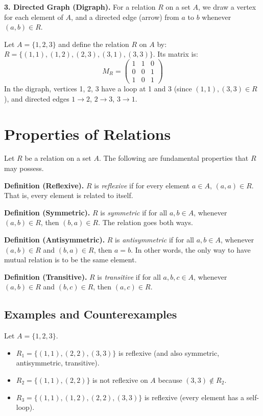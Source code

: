 \documentclass[11pt,a4paper]{article}
\begin{document}
\textbf{3. Directed Graph (Digraph).} For a relation $R$ on a set $A$, we draw a vertex for each element of $A$, and a directed edge (arrow) from $a$ to $b$ whenever $(a, b) \in R$.

\begin{example}
Let $A = \{1, 2, 3\}$ and define the relation $R$ on $A$ by: $R = \{(1,1), (1,2), (2,3), (3,1), (3,3)\}$. Its matrix is:
\begin{equation*}
    M_R = \begin{pmatrix}
        1 & 1 & 0 \\
        0 & 0 & 1 \\
        1 & 0 & 1
    \end{pmatrix}
\end{equation*}
In the digraph, vertices 1, 2, 3 have a loop at 1 and 3 (since $(1,1), (3,3) \in R$), and directed edges $1 \to 2$, $2 \to 3$, $3 \to 1$.
\end{example}

\section{Properties of Relations}

Let $R$ be a relation on a set $A$. The following are fundamental properties that $R$ may possess.

\textbf{Definition (Reflexive).} $R$ is \textit{reflexive} if for every element $a \in A$, $(a, a) \in R$. That is, every element is related to itself.

\textbf{Definition (Symmetric).} $R$ is \textit{symmetric} if for all $a, b \in A$, whenever $(a, b) \in R$, then $(b, a) \in R$. The relation goes both ways.

\textbf{Definition (Antisymmetric).} $R$ is \textit{antisymmetric} if for all $a, b \in A$, whenever $(a, b) \in R$ and $(b, a) \in R$, then $a = b$. In other words, the only way to have mutual relation is to be the same element.

\textbf{Definition (Transitive).} $R$ is \textit{transitive} if for all $a, b, c \in A$, whenever $(a, b) \in R$ and $(b, c) \in R$, then $(a, c) \in R$.

\subsection{Examples and Counterexamples}

\begin{example}[Reflexive]
Let $A = \{1, 2, 3\}$.
\begin{itemize}
    \item $R_1 = \{(1,1), (2,2), (3,3)\}$ is reflexive (and also symmetric, antisymmetric, transitive).
    \item $R_2 = \{(1,1), (2,2)\}$ is not reflexive on $A$ because $(3,3) \notin R_2$.
    \item $R_3 = \{(1,1), (1,2), (2,2), (3,3)\}$ is reflexive (every element has a self-loop).
\end{itemize}
\end{example}
\end{document}
